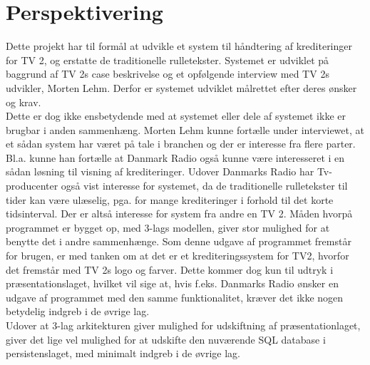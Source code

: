 \section{Perspektivering}

Dette projekt har til formål at udvikle et system til håndtering af krediteringer for TV 2, og erstatte de traditionelle rulletekster. Systemet er udviklet på baggrund af TV 2s case beskrivelse og et opfølgende interview med TV 2s udvikler, Morten Lehm. Derfor er systemet udviklet målrettet efter deres ønsker og krav. \\
Dette er dog ikke ensbetydende med at systemet eller dele af systemet ikke er brugbar i anden sammenhæng. Morten Lehm kunne fortælle under interviewet, at et sådan system har været på tale i branchen og der er interesse fra flere parter. Bl.a. kunne han fortælle at Danmark Radio også kunne være interesseret i en sådan løsning til visning af krediteringer. Udover Danmarks Radio har Tv-producenter også vist interesse for systemet, da de traditionelle rulletekster til tider kan være ulæselig, pga. for mange krediteringer i forhold til det korte tidsinterval. Der er altså interesse for system fra andre en TV 2. Måden hvorpå programmet er bygget op, med 3-lags modellen, giver stor mulighed for at benytte det i andre sammenhænge. Som denne udgave af programmet fremstår for brugen, er med tanken om at det er et krediteringssystem for TV2, hvorfor det fremstår med TV 2s logo og farver. Dette kommer dog kun til udtryk i præsentationslaget, hvilket vil sige at, hvis f.eks. Danmarks Radio ønsker en udgave af programmet med den samme funktionalitet, kræver det ikke nogen betydelig indgreb i de øvrige lag. \\
Udover at 3-lag arkitekturen giver mulighed for udskiftning af præsentationlaget, giver det lige vel mulighed for at udskifte den nuværende SQL database i persistenslaget, med minimalt indgreb i de øvrige lag. \\\\


